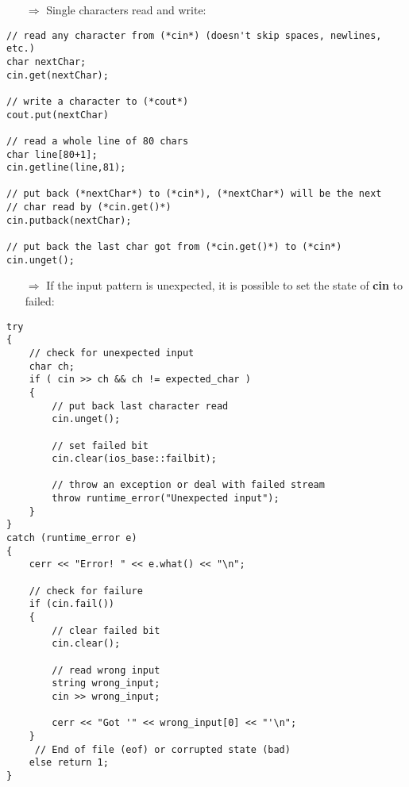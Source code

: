 \documentclass[10pt]{article}
\begin{document}
\begin{enumerate}
\item[$\Rightarrow$] Single characters read and write:
\end{enumerate}
\begin{lstlisting}
// read any character from (*cin*) (doesn't skip spaces, newlines, etc.)
char nextChar;
cin.get(nextChar);

// write a character to (*cout*)
cout.put(nextChar)

// read a whole line of 80 chars
char line[80+1];
cin.getline(line,81);

// put back (*nextChar*) to (*cin*), (*nextChar*) will be the next 
// char read by (*cin.get()*)
cin.putback(nextChar);

// put back the last char got from (*cin.get()*) to (*cin*)
cin.unget();
\end{lstlisting}
\begin{enumerate}
\item[$\Rightarrow$] If the input pattern is unexpected, it is possible to set the state of \textbf{cin} to failed:
\end{enumerate}
\begin{lstlisting}
try
{
    // check for unexpected input
    char ch;
    if ( cin >> ch && ch != expected_char )
    {
        // put back last character read
        cin.unget();
        
        // set failed bit
        cin.clear(ios_base::failbit);
    
        // throw an exception or deal with failed stream
        throw runtime_error("Unexpected input");
    }
}
catch (runtime_error e)
{
    cerr << "Error! " << e.what() << "\n";
            
    // check for failure
    if (cin.fail())
    {
        // clear failed bit
        cin.clear();
                
        // read wrong input
        string wrong_input;
        cin >> wrong_input;
                    
        cerr << "Got '" << wrong_input[0] << "'\n";
    }
     // End of file (eof) or corrupted state (bad)
    else return 1;
}
\end{lstlisting}

%
%
\end{document}
